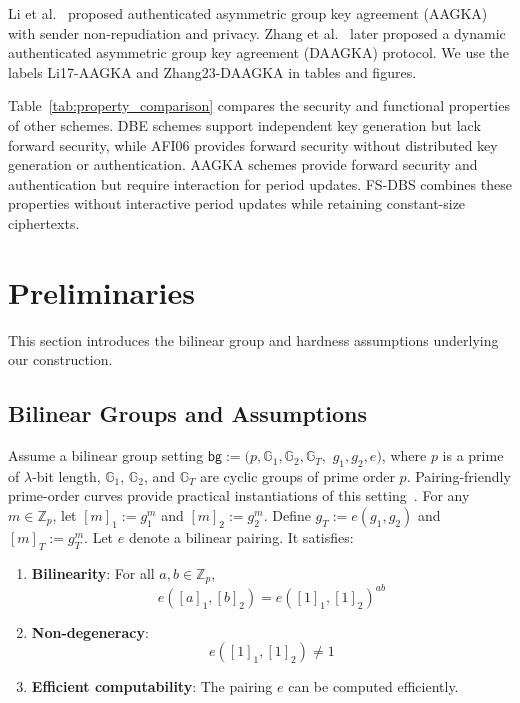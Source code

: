 \documentclass[sigconf,anonymous]{acmart}
\theoremstyle{definition}
\theoremstyle{definition}
\theoremstyle{definition}
\theoremstyle{definition}
\theoremstyle{definition}
\theoremstyle{definition}
\theoremstyle{definition}
\theoremstyle{definition}
\theoremstyle{definition}
\begin{document}
Li et al.~\cite{li2017aagka} proposed authenticated asymmetric group key
agreement (AAGKA) with sender non-repudiation and privacy. Zhang et
al.~\cite{zhang2023daagka} later proposed a dynamic authenticated asymmetric
group key agreement (DAAGKA) protocol. We use the labels Li17-AAGKA and
Zhang23-DAAGKA in tables and figures.


Table~\ref{tab:property_comparison} compares the security and functional properties of other schemes. DBE schemes support independent key generation but lack forward security, while AFI06 provides forward security without distributed key generation or authentication. AAGKA schemes provide forward security and authentication but require interaction for period updates. FS-DBS combines these properties without interactive period updates while retaining constant-size ciphertexts.

\section{Preliminaries}
	This section introduces the bilinear group and hardness assumptions
underlying our construction.
\subsection{Bilinear Groups and Assumptions}
Assume a bilinear group setting $\mathsf{bg}:= (p, \mathbb{G}_{1}, \mathbb{G}
_{2}, \mathbb{G}_{T}, $ $g_{1}, g_{2}, e)$, where $p$ is a prime of $\lambda$-bit
length, $\mathbb{G}_{1}$, $\mathbb{G}_{2}$, and $\mathbb{G}_{T}$ are cyclic groups
of prime order $p$. Pairing-friendly prime-order curves provide practical
instantiations of this setting~\cite{barreto2006pairing}. For any
$m\in\mathbb{Z}_p$, let $[m]_1:=g_1^m$ and $[m]_2:=g_2^m$. Define $g_T:=e(g_1,g_2)$ and $[m]_T:=g_T^m$.
Let $e$ denote a bilinear pairing. It satisfies:


\begin{enumerate}
	\item \textbf{Bilinearity}: For all $a,b\in\mathbb{Z}_p$,
	\begin{equation*}
		e([a]_1,[b]_2)=e([1]_1,[1]_2)^{ab}
	\end{equation*}
	
	\item \textbf{Non-degeneracy}:
	\begin{equation*}
		e([1]_{1}, [1]_{2}) \neq 1
	\end{equation*}
	
	\item \textbf{Efficient computability}: The pairing $e$ can be computed efficiently.
\end{enumerate}
\end{document}
